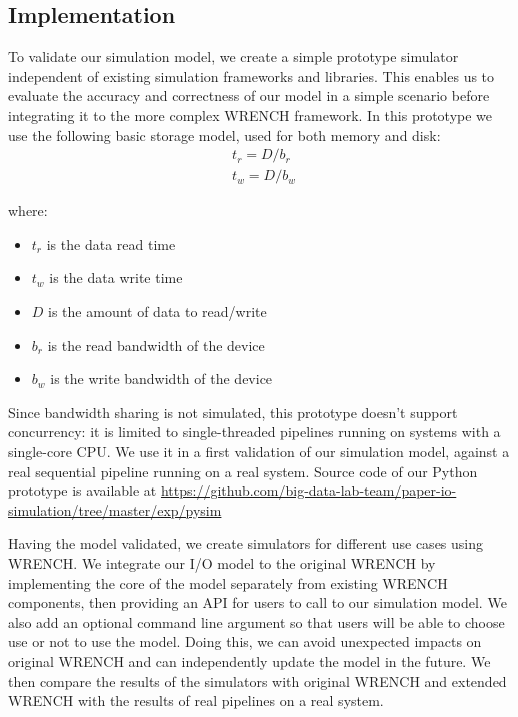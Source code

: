 \documentclass[conference]{IEEEtran}
\begin{document}
		\subsection{Implementation}

			To validate our simulation model, we create a simple prototype
			simulator independent of existing simulation frameworks and libraries. 
			This enables us to evaluate the accuracy and correctness of our 
			model in a simple scenario before integrating it to the more complex WRENCH framework. 
			In this prototype we use the following basic storage model, used for both memory and disk: 
			\begin{align*}
				& t_{r} = D / b_r \\ 
				& t_{w} = D / b_w\
			\end{align*}		
			
			where:
			\begin{itemize}
				\item $t_{r}$ is the data read time
				\item $t_{w}$ is the data write time
				\item $D$ is the amount of data to read/write
				\item $b_r$ is the read bandwidth of the device
				\item $b_w$ is the write bandwidth of the device
			\end{itemize}			

			Since bandwidth sharing is not simulated, this prototype doesn't support 
			concurrency: it is limited to single-threaded pipelines running on systems 
			with a single-core CPU. We use it in a first validation of our simulation 
			model, against a real sequential pipeline running on a real system.
			Source code of our Python prototype is available at 
            \url{https://github.com/big-data-lab-team/paper-io-simulation/tree/master/exp/pysim}
			
			Having the model validated, we create simulators for different use cases 
			using WRENCH.
			We integrate our I/O model to the original WRENCH by implementing 
			the core of the model separately from existing WRENCH components, 
			then providing an API for users to call to our simulation model. 
			We also add an optional command line argument so that users will be able 
			to choose use or not to use the model. Doing this, we can avoid 
			unexpected impacts on original WRENCH and can independently update 
			the model in the future. 
			We then compare the results of the simulators with
			original WRENCH and extended WRENCH with the results of real
			pipelines on a real system. 
		
\end{document}
